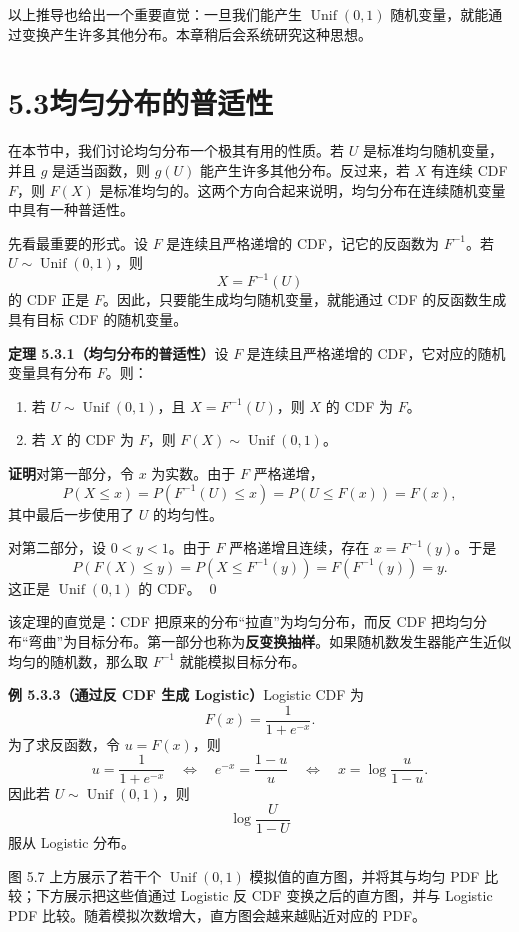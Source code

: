 \documentclass[UTF8,12pt,a4paper,fontset=fandol]{ctexart}
\begin{document}
以上推导也给出一个重要直觉：一旦我们能产生 $\operatorname{Unif}(0,1)$ 随机变量，就能通过变换产生许多其他分布。本章稍后会系统研究这种思想。

\section*{5.3\quad 均匀分布的普适性}

在本节中，我们讨论均匀分布一个极其有用的性质。若 $U$ 是标准均匀随机变量，并且 $g$ 是适当函数，则 $g(U)$ 能产生许多其他分布。反过来，若 $X$ 有连续 CDF $F$，则 $F(X)$ 是标准均匀的。这两个方向合起来说明，均匀分布在连续随机变量中具有一种普适性。

先看最重要的形式。设 $F$ 是连续且严格递增的 CDF，记它的反函数为 $F^{-1}$。若 $U\sim\operatorname{Unif}(0,1)$，则
\[
  X=F^{-1}(U)
\]
的 CDF 正是 $F$。因此，只要能生成均匀随机变量，就能通过 CDF 的反函数生成具有目标 CDF 的随机变量。

\noindent\textbf{定理 5.3.1（均匀分布的普适性）}\quad 设 $F$ 是连续且严格递增的 CDF，它对应的随机变量具有分布 $F$。则：
\begin{enumerate}
  \item 若 $U\sim\operatorname{Unif}(0,1)$，且 $X=F^{-1}(U)$，则 $X$ 的 CDF 为 $F$。
  \item 若 $X$ 的 CDF 为 $F$，则 $F(X)\sim\operatorname{Unif}(0,1)$。
\end{enumerate}

\noindent\textbf{证明}\quad 对第一部分，令 $x$ 为实数。由于 $F$ 严格递增，
\[
  P(X\le x)=P(F^{-1}(U)\le x)=P(U\le F(x))=F(x),
\]
其中最后一步使用了 $U$ 的均匀性。

对第二部分，设 $0<y<1$。由于 $F$ 严格递增且连续，存在 $x=F^{-1}(y)$。于是
\[
  P(F(X)\le y)=P(X\le F^{-1}(y))=F(F^{-1}(y))=y.
\]
这正是 $\operatorname{Unif}(0,1)$ 的 CDF。
\qed

该定理的直觉是：CDF 把原来的分布“拉直”为均匀分布，而反 CDF 把均匀分布“弯曲”为目标分布。第一部分也称为\textbf{反变换抽样}。如果随机数发生器能产生近似均匀的随机数，那么取 $F^{-1}$ 就能模拟目标分布。

\noindent\textbf{例 5.3.3（通过反 CDF 生成 Logistic）}\quad Logistic CDF 为
\[
  F(x)=\frac{1}{1+e^{-x}}.
\]
为了求反函数，令 $u=F(x)$，则
\[
  u=\frac{1}{1+e^{-x}}
  \quad\Longleftrightarrow\quad
  e^{-x}=\frac{1-u}{u}
  \quad\Longleftrightarrow\quad
  x=\log\frac{u}{1-u}.
\]
因此若 $U\sim\operatorname{Unif}(0,1)$，则
\[
  \log\frac{U}{1-U}
\]
服从 Logistic 分布。

图 5.7 上方展示了若干个 $\operatorname{Unif}(0,1)$ 模拟值的直方图，并将其与均匀 PDF 比较；下方展示把这些值通过 Logistic 反 CDF 变换之后的直方图，并与 Logistic PDF 比较。随着模拟次数增大，直方图会越来越贴近对应的 PDF。
\end{document}
